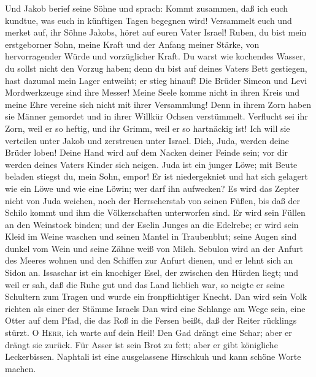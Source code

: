  Und Jakob berief seine Söhne und sprach: Kommt zusammen,
daß ich euch kundtue, was euch in künftigen Tagen begegnen wird!
 Versammelt euch und merket auf, ihr Söhne Jakobs, höret
auf euren Vater Israel!  Ruben, du bist mein erstgeborner
Sohn, meine Kraft und der Anfang meiner Stärke, von hervorragender Würde
und vorzüglicher Kraft.  Du warst wie kochendes Wasser, du
sollst nicht den Vorzug haben; denn du bist auf deines Vaters Bett
gestiegen, hast dazumal mein Lager entweiht; er stieg hinauf!
 Die Brüder Simeon und Levi Mordwerkzeuge sind ihre
Messer!  Meine Seele komme nicht in ihren Kreis und meine
Ehre vereine sich nicht mit ihrer Versammlung! Denn in ihrem Zorn haben
sie Männer gemordet und in ihrer Willkür Ochsen verstümmelt.
 Verflucht sei ihr Zorn, weil er so heftig, und ihr Grimm,
weil er so hartnäckig ist! Ich will sie verteilen unter Jakob und
zerstreuen unter Israel.  Dich, Juda, werden deine Brüder
loben! Deine Hand wird auf dem Nacken deiner Feinde sein; vor dir werden
deines Vaters Kinder sich neigen.  Juda ist ein junger
Löwe; mit Beute beladen stiegst du, mein Sohn, empor! Er ist
niedergekniet und hat sich gelagert wie ein Löwe und wie eine Löwin; wer
darf ihn aufwecken?  Es wird das Zepter nicht von Juda
weichen, noch der Herrscherstab von seinen Füßen, bis daß der Schilo
kommt und ihm die Völkerschaften unterworfen sind.  Er
wird sein Füllen an den Weinstock binden; und der Eselin Junges an die
Edelrebe; er wird sein Kleid im Weine waschen und seinen Mantel in
Traubenblut;  seine Augen sind dunkel vom Wein und seine
Zähne weiß von Milch.  Sebulon wird an der Anfurt des
Meeres wohnen und den Schiffen zur Anfurt dienen, und er lehnt sich an
Sidon an.  Issaschar ist ein knochiger Esel, der zwischen
den Hürden liegt;  und weil er sah, daß die Ruhe gut und
das Land lieblich war, so neigte er seine Schultern zum Tragen und wurde
ein fronpflichtiger Knecht.  Dan wird sein Volk richten
als einer der Stämme Israels  Dan wird eine Schlange am
Wege sein, eine Otter auf dem Pfad, die das Roß in die Fersen beißt, daß
der Reiter rücklings stürzt.  O \textsc{Herr}, ich warte
auf dein Heil!  Den Gad drängt eine Schar; aber er drängt
sie zurück.  Für Asser ist sein Brot zu fett; aber er
gibt königliche Leckerbissen.  Naphtali ist eine
ausgelassene Hirschkuh und kann schöne Worte machen. 
